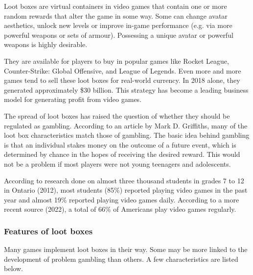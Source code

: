 \documentclass[10pt,oneside,english,a4paper]{article}
\begin{document}
	Loot boxes are virtual containers in video games that contain one or more random rewards that alter the game in some way. Some can change avatar aesthetics, unlock new levels or improve in-game performance (e.g. via more powerful weapons or sets of armour). Possessing a unique avatar or powerful weapons is highly desirable. \par
	They are available for players to buy in popular games like Rocket League, Counter-Strike: Global Offensive, and League of Legends. Even more and more games tend to sell these loot boxes for real-world currency. In 2018 alone, they generated approximately \$30 billion\cite{juniper:revenue}. This strategy has become a leading business model for generating profit from video games. \par
	The spread of loot boxes has raised the question of whether they should be regulated as gambling. According to an article by Mark D. Griffiths\cite{griffiths:lootboxes}, many of the loot box characteristics match those of gambling. The basic idea behind gambling is that an individual stakes money on the outcome of a future event, which is determined by chance in the hopes of receiving the desired reward. This would not be a problem if most players were not young teenagers and adolescents. \par
	According to research\cite{springer:research} done on almost three thousand students in grades 7 to 12 in Ontario (2012), most students (85\%) reported playing video games in the past year and almost 19\% reported playing video games daily. According to a more recent source\cite{theesa:facts} (2022), a total of 66\% of Americans play video games regularly. 

\subsubsection{Features of loot boxes} \label{sec:features}

	Many games implement loot boxes in their way. Some may be more linked to the development of problem gambling than others. A few characteristics are listed below.
\end{document}
